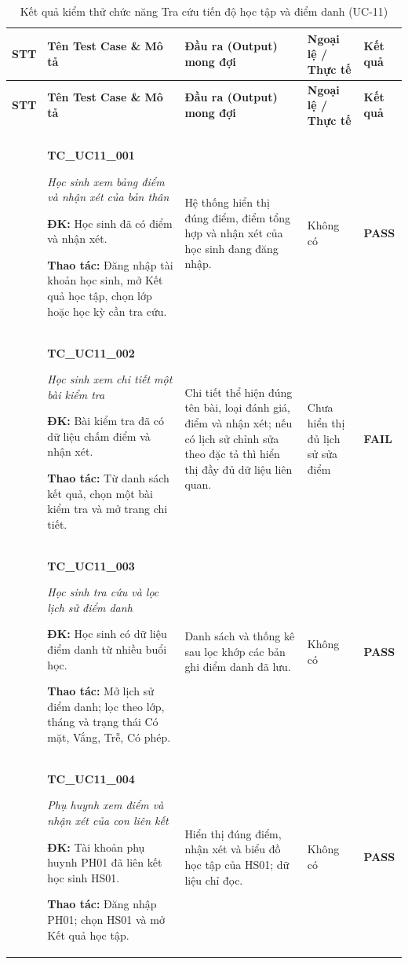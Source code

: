\begin{longtable}{|>{\centering\arraybackslash}p{0.8cm}|>{\raggedright\arraybackslash}p{4.6cm}|>{\raggedright\arraybackslash}p{3.8cm}|>{\raggedright\arraybackslash}p{3.8cm}|>{\centering\arraybackslash}p{1.5cm}|}
\caption{Kết quả kiểm thử chức năng Tra cứu tiến độ học tập và điểm danh (UC-11)}\label{tab:academic-uc11}\\
\hline
\textbf{STT} & \textbf{Tên Test Case \& Mô tả} & \textbf{Đầu ra (Output) mong đợi} & \textbf{Ngoại lệ / Thực tế} & \textbf{Kết quả} \\ \hline
\endfirsthead
\hline
\textbf{STT} & \textbf{Tên Test Case \& Mô tả} & \textbf{Đầu ra (Output) mong đợi} & \textbf{Ngoại lệ / Thực tế} & \textbf{Kết quả} \\ \hline
\endhead
\hline \multicolumn{5}{r}{\scriptsize\itshape Xem tiếp ở trang sau} \\
\endfoot
\hline
\endlastfoot
1 & \textbf{TC\_UC11\_001}\par \textit{Học sinh xem bảng điểm và nhận xét của bản thân}\par \textbf{ĐK:} Học sinh đã có điểm và nhận xét.\par \textbf{Thao tác:} Đăng nhập tài khoản học sinh, mở Kết quả học tập, chọn lớp hoặc học kỳ cần tra cứu. & Hệ thống hiển thị đúng điểm, điểm tổng hợp và nhận xét của học sinh đang đăng nhập. & Không có & \textbf{PASS} \\ \hline
2 & \textbf{TC\_UC11\_002}\par \textit{Học sinh xem chi tiết một bài kiểm tra}\par \textbf{ĐK:} Bài kiểm tra đã có dữ liệu chấm điểm và nhận xét.\par \textbf{Thao tác:} Từ danh sách kết quả, chọn một bài kiểm tra và mở trang chi tiết. & Chi tiết thể hiện đúng tên bài, loại đánh giá, điểm và nhận xét; nếu có lịch sử chỉnh sửa theo đặc tả thì hiển thị đầy đủ dữ liệu liên quan. & Chưa hiển thị đủ lịch sử sửa điểm & \textbf{FAIL} \\ \hline
3 & \textbf{TC\_UC11\_003}\par \textit{Học sinh tra cứu và lọc lịch sử điểm danh}\par \textbf{ĐK:} Học sinh có dữ liệu điểm danh từ nhiều buổi học.\par \textbf{Thao tác:} Mở lịch sử điểm danh; lọc theo lớp, tháng và trạng thái Có mặt, Vắng, Trễ, Có phép. & Danh sách và thống kê sau lọc khớp các bản ghi điểm danh đã lưu. & Không có & \textbf{PASS} \\ \hline
4 & \textbf{TC\_UC11\_004}\par \textit{Phụ huynh xem điểm và nhận xét của con liên kết}\par \textbf{ĐK:} Tài khoản phụ huynh PH01 đã liên kết học sinh HS01.\par \textbf{Thao tác:} Đăng nhập PH01; chọn HS01 và mở Kết quả học tập. & Hiển thị đúng điểm, nhận xét và biểu đồ học tập của HS01; dữ liệu chỉ đọc. & Không có & \textbf{PASS} \\ \hline

\end{longtable}
